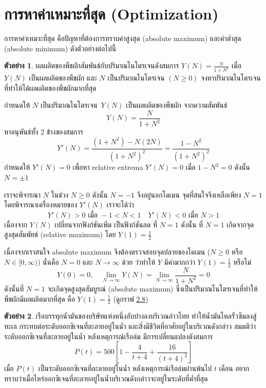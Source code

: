 \documentclass[
]{book}
\theoremstyle{definition}
\theoremstyle{definition}
\newtheorem{example}{ตัวอย่าง}[chapter]
\theoremstyle{definition}
\theoremstyle{definition}
\theoremstyle{remark}
\begin{document}
\section{การหาค่าเหมาะที่สุด (Optimization)}\label{uxe01uxe32uxe23uxe2buxe32uxe04uxe32uxe40uxe2buxe21uxe32uxe30uxe17uxe2auxe14-optimization}

การหาค่าเหมาะที่สุด คือปัญหาที่ต้องการทราบค่าสูงสุด (absolute maximum) และค่าต่ำสุด
(absolute minimum) ดังตัวอย่างต่อไปนี้

\begin{example}
ผลผลิตของพืชผักสัมพันธ์กับปริมาณไนโตรเจนดังสมการ
\(\displaystyle Y(N)= \frac{N}{1+N^2}\) เมื่อ \(Y(N)\) เป็นผลผลิตของพืชผัก และ \(N\)
เป็นปริมาณไนโตรเจน \((N \ge 0)\) จงหาปริมาณไนโตรเจนที่ทำให้ได้ผลผลิตของพืชผักมากที่สุด
\end{example}

กำหนดให้ \(N\) เป็นปริมาณไนโตรเจน~\(Y(N)\) เป็นผลผลิตของพืชผัก จากความสัมพันธ์
\[Y(N)= \frac{N}{1+N^2}\] หาอนุพันธ์ทั้ง 2 ข้างของสมการ
\[Y'(N)= \frac{(1+N^2)-N(2N)}{(1+N^2)^2}= \frac{1-N^2}{(1+N^2)^2}\]
กำหนดให้ \(Y'(N)=0\) เพื่อหา relative extrema \(Y'(N)=0\) เมื่อ \(1-N^2=0\) ดังนั้น
\(N= \pm 1\)

เราจะพิจารณา \(N\) ในช่วง \(N \ge 0\) ดังนั้น \(N=-1\) จึงอยู่นอกโดเมน
จุดที่สนใจจึงเหลือเพียง \(N=1\) โดยพิจารณาเครื่องหมายของ \(Y'(N)\) เราจะได้ว่า
\[Y'(N) > 0 \text{ เมื่อ }  -1< N <1  \quad  Y'(N) < 0 \text{ เมื่อ } N > 1\]
เนื่องจาก \(Y(N)\) เปลี่ยนจากฟังก์ชันเพิ่ม เป็นฟังก์ชันลด ที่ \(N=1\) ดังนั้น ที่ \(N=1\)
เกิดจากจุดสูงสุดสัมพัทธ์ (relative maximum) โดย \(Y(1)= \frac{1}{2}\)

เนื่องจากเราสนใจ absolute maximum จึงต้องตรวจสอบจุดปลายของโดเมน (\(N \ge 0\)
หรือ \(N \in [0,\infty)\)) นั่นคือ \(N=0\) และ \(N \rightarrow \infty\) ด้วย ว่าทำให้
\(Y\) มีค่ามากกว่า \(Y(1)= \frac{1}{2}\) หรือไม่
\[Y(0)=0,   \quad  \lim_{N \rightarrow \infty} Y(N) =\lim_{N \rightarrow \infty} \frac{N}{1+N^2} = 0\]
ดังนั้นที่ \(N=1\) จะเกิดจุดสูงสุดสัมบูรณ์ (absolute maximum)
ซึ่งเป็นปริมาณไนโตรเจนที่ทำให้พืชผักมีผลผลิตมากที่สุด คือ \(Y(1)= \frac{1}{2}\) (ดูกราฟ
\hyperref[fig-nitrogen]{2.8})

\begin{example}
เรือบรรทุกน้ำมันของบริษัทแห่งหนึ่งอับปางลงบริเวณอ่าวไทย ทำให้น้ำมันไหลรั่วซึมลงสู่ทะเล
กระทบต่อระดับออกซิเจนที่ละลายอยู่ในน้ำ และสิ่งมีชีวิตที่อาศัยอยู่ในบริเวณดังกล่าว
สมมติว่าระดับออกซิเจนที่ละลายอยู่ในน้ำ หลังเหตุการณ์เรือล่ม มีการเปลี่ยนแปลงดังสมการ
\[P(t)=500[1- \frac{4}{t+4} + \frac{16}{(t+4)^2}]\] เมื่อ \(P(t)\)
เป็นระดับออกซิเจนที่ละลายอยู่ในน้ำ หลังเหตุการณ์เรือล่มผ่านพ้นไป \(t\) เดือน
อยากทราบว่าเมื่อไหร่ออกซิเจนที่ละลายอยู่ในน้ำบริเวณดังกล่าวจะอยู่ในระดับที่ต่ำที่สุด
\end{example}
\end{document}
